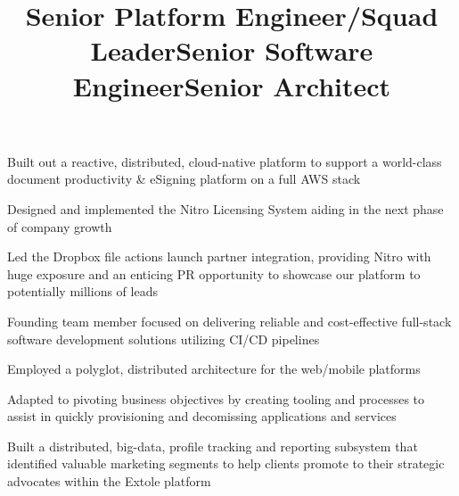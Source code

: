 \documentclass[margin,line]{resume}
\newenvironment{bullet-list}{
  \begin{list}{$\bullet$}{%
      \setlength{\itemsep}{0in}
      \setlength{\parsep}{0in} \setlength{\parskip}{0in}
      \setlength{\topsep}{0in} \setlength{\partopsep}{0in}
      \setlength{\leftmargin}{0.2in}}}{\end{list}}
\begin{document}
\begin{resume}
\title{Senior Platform Engineer/Squad Leader}
\begin{position}
\vspace{-.3cm}
\begin{bullet-list}
\item Built out a reactive, distributed, cloud-native platform to support a
world-class document productivity \& eSigning platform on a full AWS stack
\item Designed and implemented the Nitro Licensing System aiding in
the next phase of company growth
\item Led the Dropbox file actions launch partner integration, providing Nitro
with huge exposure and an enticing PR opportunity to showcase our platform to
potentially millions of leads
\end{bullet-list}
\end{position}

\title{Senior Software Engineer}
\begin{position}
\vspace{-.3cm}
\begin{bullet-list}
\item Founding team member focused on delivering reliable and
cost-effective full-stack software development solutions utilizing CI/CD pipelines
\item Employed a polyglot, distributed architecture for the web/mobile platforms
\item Adapted to pivoting business objectives by creating tooling and processes
to assist in quickly provisioning and decomissing applications and services
\end{bullet-list}
\end{position}

\title{Senior Architect}
\begin{position}
\vspace{-.3cm}
\begin{bullet-list}
\item Built a distributed, big-data, profile tracking and reporting subsystem
that identified valuable marketing segments to help clients promote to
their strategic advocates within the Extole platform
\end{bullet-list}
\end{position}


\end{resume}
\end{document}
